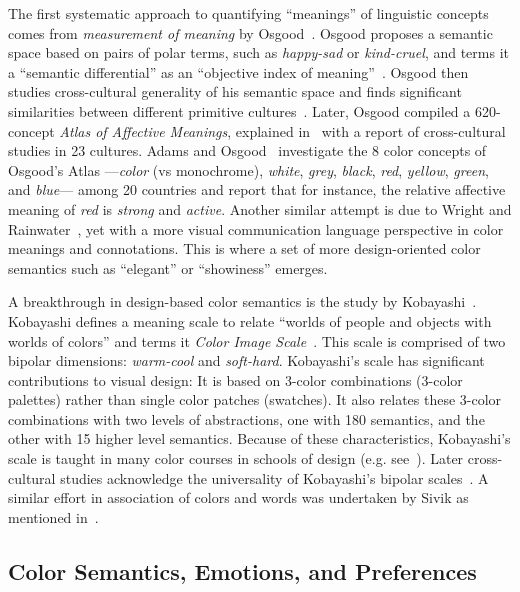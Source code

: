 \documentclass[prodmode,acmtochi]{acmsmall}
\begin{document}
The first systematic approach to quantifying ``meanings'' of linguistic concepts comes from \emph{measurement of meaning} by Osgood~\cite{osgood1952nature,osgood1957measurement}. Osgood proposes a semantic space based on pairs of polar terms, such as \emph{happy-sad} or \emph{kind-cruel}, and terms it a ``semantic differential'' as an ``objective index of meaning''~\cite{osgood1952nature}. Osgood then studies cross-cultural generality of his semantic space and finds significant similarities between different primitive cultures~\cite{osgood1960cross}. Later, Osgood compiled a 620-concept \emph{Atlas of Affective Meanings}, explained in~\cite{osgood1971exploration} with a report of cross-cultural studies in 23 cultures. Adams and Osgood~\cite{adams1973cross} investigate the 8 color concepts of Osgood's Atlas ---\emph{color} (vs monochrome), \emph{white}, \emph{grey}, \emph{black}, \emph{red}, \emph{yellow}, \emph{green}, and \emph{blue}--- among 20 countries and report that for instance, the relative affective meaning of \emph{red} is \emph{strong} and \emph{active}.
Another similar attempt is due to Wright and Rainwater~\cite{wright1962meanings}, yet with a more visual communication language perspective in color meanings and connotations. This is where a set of more design-oriented color semantics such as ``elegant'' or ``showiness'' emerges.


A breakthrough in design-based color semantics is the study by Kobayashi~\cite{kobayashi1981aim}. Kobayashi defines a meaning scale to relate ``worlds of people and objects with worlds of colors'' and terms it \emph{Color Image Scale}~\cite{kobayashi1991color}. This scale is comprised of two bipolar dimensions: \emph{warm-cool} and \emph{soft-hard}. Kobayashi's scale has significant contributions to visual design: It is based on 3-color combinations (3-color palettes) rather than single color patches (swatches). It also relates these 3-color combinations with two levels of abstractions, one with 180 semantics, and the other with 15 higher level semantics. Because of these characteristics, Kobayashi's scale is taught in many color courses in schools of design (e.g. see~\cite{green2006value}). Later cross-cultural studies acknowledge the universality of Kobayashi's bipolar scales~\cite{ou2004studyI,ou2004studyII,ou2012cross}.
A similar effort in association of colors and words was undertaken by Sivik as mentioned in~\cite{hardin1997color}.

\subsection{Color Semantics, Emotions, and Preferences}
\end{document}
